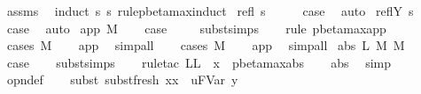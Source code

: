 \begin{isabellebody}
%
\isadelimproof
%
\endisadelimproof
%
\isatagproof
{}\isamarkupfalse%
\ assms\ \isamarkupfalse%
\ {\isacharparenleft}induct\ s\ s{\isacharprime}\ rule{\isacharcolon}pbeta{\isacharunderscore}max{\isachardot}induct{\isacharparenright}\isanewline
{}\isamarkupfalse%
\ {\isacharparenleft}refl\ s{\isacharparenright}\isanewline
\ \ \isamarkupfalse%
\ \isamarkupfalse%
\ {\isacharquery}case\ \isamarkupfalse%
\ auto\isanewline
{}\isamarkupfalse%
\isanewline
{}\isamarkupfalse%
\ {\isacharparenleft}reflY\ s{\isacharparenright}\isanewline
\ \ \isamarkupfalse%
\ \isamarkupfalse%
\ {\isacharquery}case\ \isamarkupfalse%
\ auto\isanewline
{}\isamarkupfalse%
\isanewline
{}\isamarkupfalse%
\ {\isacharparenleft}app\ M{\isacharparenright}\isanewline
\ \ \isamarkupfalse%
\ {\isacharquery}case\ \isanewline
\ \ \isamarkupfalse%
\ subst{\isachardot}simps\isanewline
\ \ \isamarkupfalse%
\ {\isacharparenleft}rule\ pbeta{\isacharunderscore}max{\isachardot}app{\isacharparenright}\isanewline
\ \ \isamarkupfalse%
\ {\isacharparenleft}cases\ M{\isacharparenright}\isanewline
\ \ \isamarkupfalse%
\ app\ \isamarkupfalse%
\ simp{\isacharunderscore}all\isanewline
\ \ \isamarkupfalse%
\ {\isacharparenleft}cases\ M{\isacharparenright}\isanewline
\ \ \isamarkupfalse%
\ app\ \isamarkupfalse%
\ simp{\isacharunderscore}all\isanewline
{}\isamarkupfalse%
\isanewline
{}\isamarkupfalse%
\ {\isacharparenleft}abs\ L\ M\ M{\isacharprime}{\isacharparenright}\ \isanewline
\ \ \isamarkupfalse%
\ {\isacharquery}case\isanewline
\ \ \isamarkupfalse%
\ subst{\isachardot}simps\isanewline
\ \ \isamarkupfalse%
\ {\isacharparenleft}rule{\isacharunderscore}tac\ L{\isacharequal}{\isachardoublequoteopen}L\ {\isasymunion}\ {\isacharbraceleft}x{\isacharbraceright}{\isachardoublequoteclose}\ \ pbeta{\isacharunderscore}max{\isachardot}abs{\isacharparenright}\isanewline
\ \ \isamarkupfalse%
\ abs\ \isamarkupfalse%
\ simp\ \isanewline
\ \ \isamarkupfalse%
\ opn{\isacharprime}{\isacharunderscore}def\isanewline
\ \ \isamarkupfalse%
\ {\isacharparenleft}subst\ subst{\isacharunderscore}fresh{}{\isacharbrackleft}\ x{\isacharequal}x\ \ u{\isacharequal}{\isachardoublequoteopen}FVar\ y{\isachardoublequoteclose}{\isacharbrackright}{\isacharparenright}\isanewline

\end{isabellebody}
